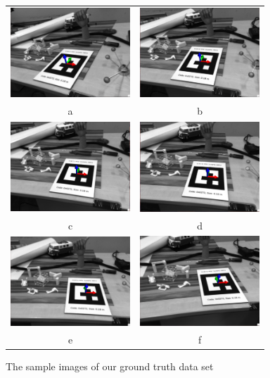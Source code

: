 \begin{figure}[H]
\centering
\begin{tabular}{cc}
  \includegraphics[width=45mm]{figures/sample_0} &   \includegraphics[width=45mm]{figures/sample_1}  \\
  a & b \\[6pt]
  \includegraphics[width=45mm]{figures/sample_2} &   \includegraphics[width=45mm]{figures/sample_3} \\
  c & d \\[6pt]
  \includegraphics[width=45mm]{figures/sample_4} &   \includegraphics[width=45mm]{figures/sample_5} \\
  e & f \\[6pt]
\end{tabular}
\caption{The sample images of our ground truth data set}\label{fig:sample_dataset_marker}
\end{figure}

